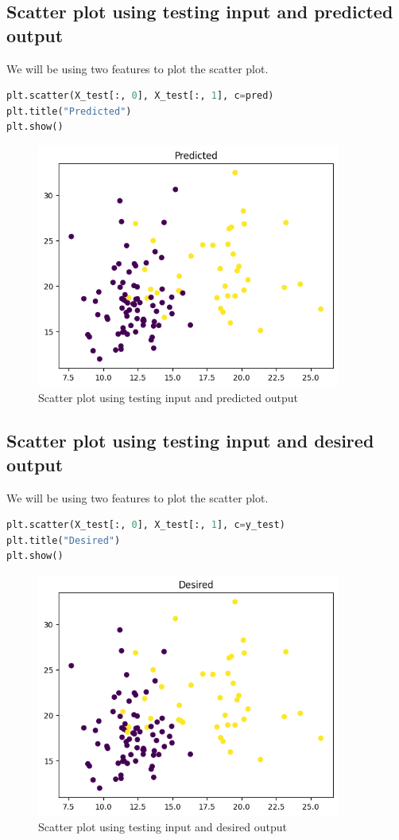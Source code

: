 \subsection{Scatter plot using testing input and predicted output}
We will be using two features to plot the scatter plot.
\begin{lstlisting}[language=Python]
plt.scatter(X_test[:, 0], X_test[:, 1], c=pred)
plt.title("Predicted")
plt.show()
\end{lstlisting}
\begin{figure}[ht]
    \centering
    \includegraphics[width=10cm]{ch/figures/scatter4.png}
    \caption{Scatter plot using testing input and predicted output}
    \label{fig:scatter4}
\end{figure}
\subsection{Scatter plot using testing input and desired output}
We will be using two features to plot the scatter plot.
\begin{lstlisting}[language=Python]
plt.scatter(X_test[:, 0], X_test[:, 1], c=y_test)
plt.title("Desired")
plt.show()
\end{lstlisting}
\begin{figure}[ht]
    \centering
    \includegraphics[width=10cm]{ch/figures/scatter5.png}
    \caption{Scatter plot using testing input and desired output}
    \label{fig:scatter5}
\end{figure}
\break
